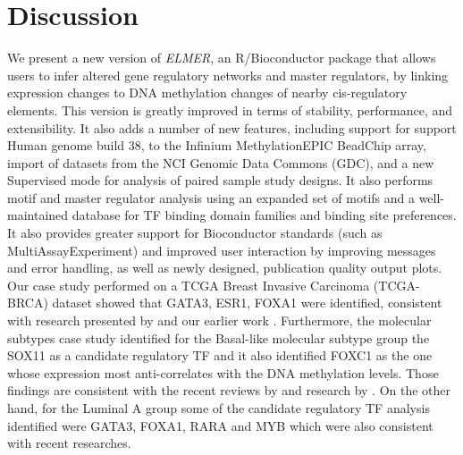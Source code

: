 
\newpage
\section*{Discussion} %
We present a new version of \textit{ELMER}, an R/Bioconductor package that allows users to infer altered gene regulatory networks and master regulators, by linking expression changes to DNA methylation changes of nearby cis-regulatory elements. This version is greatly improved in terms of stability, performance, and extensibility.  It also adds a number of new features, including support for support Human genome build 38, to the Infinium MethylationEPIC BeadChip array, import of datasets from the NCI Genomic Data Commons (GDC), and a new Supervised mode for analysis of paired sample study designs. It also performs motif and master regulator analysis using an expanded set of motifs and a well-maintained database for TF binding domain families and binding site preferences. It also provides greater support for Bioconductor standards (such as MultiAssayExperiment) and improved user interaction by improving messages and error handling, as well as newly designed, publication quality output plots. Our case study performed on a TCGA Breast Invasive Carcinoma (TCGA-BRCA) dataset showed that GATA3, ESR1, FOXA1 were identified, consistent with research presented by  and our earlier work \cite{yao2015inferring}. Furthermore, the molecular subtypes case study identified  for the Basal-like  molecular subtype group the SOX11 as a candidate regulatory TF and it also identified FOXC1 as the one whose expression most anti-correlates with the DNA methylation levels. Those findings are consistent with the recent reviews by  and research by .  On the other hand, for the Luminal A group some of the candidate regulatory TF analysis identified were GATA3, FOXA1, RARA and MYB  which were also consistent with recent researches.




